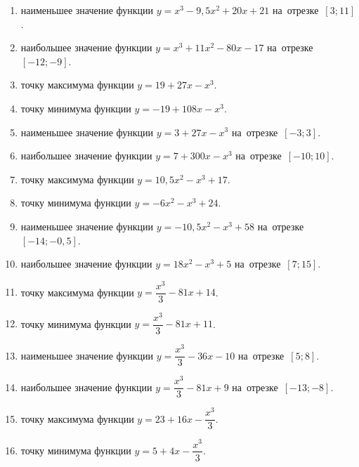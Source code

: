 \documentclass[a4paper,10pt]{article}
\begin{document}
\begin{enumerate}
\item {} наименьшее значение функции $y=x^3 -9,5x^2+20x+21$ на~отрезке~$\left[3;11\right]$.

\item {} наибольшее значение функции $y=x^3 +11x^2-80x-17$ на~отрезке~$\left[-12;-9\right]$.

\item {} точку максимума функции $y=19+27x-x^3$.

\item {} точку минимума функции $y=-19+108x-x^3$.

\item {} наименьшее значение функции $y=3+27x-x^3$ на~отрезке~$\left[-3;3\right]$.

\item {} наибольшее значение функции $y=7+300x-x^3$ на~отрезке~$\left[-10;10\right]$.

\item {} точку максимума функции $y=10,5x^2-x^3+17$.

\item {} точку минимума функции $y=-6x^2-x^3+24$.

\item {} наименьшее значение функции $y=-10,5x^2-x^3+58$ на~отрезке~$\left[-14;-0,5\right]$.

\item {} наибольшее значение функции $y=18x^2-x^3+5$ на~отрезке~$\left[7;15\right]$.

\item {} точку максимума функции $y=\dfrac{x^3}{3} -81x+14$.

\item {} точку минимума функции $y=\dfrac{x^3}{3} -81x+11$.

\item {} наименьшее значение функции $y=\dfrac{x^3}{3} -36x-10$ на~отрезке~$\left[5;8\right]$.

\item {} наибольшее значение функции $y=\dfrac{x^3}{3} -81x+9$ на~отрезке~$\left[-13;-8\right]$.

\item {} точку максимума функции $y=23 +16x-\dfrac{x^3}{3}$.

\item {} точку минимума функции $y=5 +4x-\dfrac{x^3}{3}$.


\end{enumerate}
\end{document}
